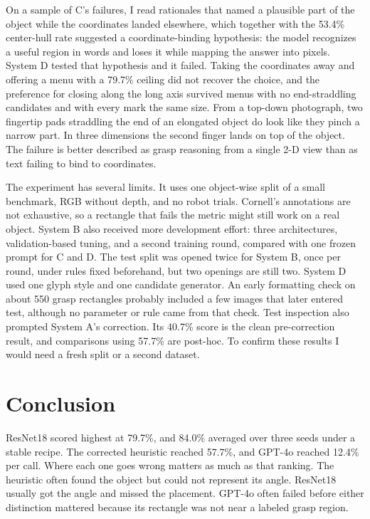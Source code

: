 \documentclass[10pt,conference,compsoc]{IEEEtran}
\begin{document}
On a sample of C's failures, I read rationales that named a plausible part of
the object while the coordinates landed elsewhere, which together with the
53.4\% center-hull rate suggested a coordinate-binding hypothesis: the model
recognizes a useful region in words and loses it while mapping the answer
into pixels. System D tested that hypothesis and it failed. Taking the
coordinates away and offering a menu with a 79.7\% ceiling did not recover
the choice, and the preference for closing along the long axis survived
menus with no end-straddling candidates and with every mark the same size.
From a top-down photograph, two fingertip pads straddling the end of an
elongated object do look like they pinch a narrow part. In three dimensions
the second finger lands on top of the object. The failure is better
described as grasp reasoning from a single 2-D view than as text failing to
bind to coordinates.

The experiment has several limits. It uses one object-wise split of a small
benchmark, RGB without depth, and no robot trials. Cornell's annotations are
not exhaustive, so a rectangle that fails the metric might still work on a
real object. System B also received more development effort: three
architectures, validation-based tuning, and a second training round,
compared with one frozen prompt for C and D. The test split was opened
twice for System B, once per round, under rules fixed beforehand, but two
openings are still two. System D used one glyph style and one candidate
generator. An early formatting check on about 550 grasp rectangles probably
included a few images that later entered test, although no parameter or rule
came from that check. Test inspection also prompted System A's correction.
Its 40.7\% score is the clean pre-correction result, and comparisons
using 57.7\% are post-hoc. To confirm these results I would need a fresh split or a second dataset.

\section{Conclusion}

ResNet18 scored highest at 79.7\%, and 84.0\% averaged over three seeds
under a stable recipe. The corrected heuristic reached 57.7\%, and GPT-4o
reached 12.4\% per call. Where each one goes wrong matters as much as that
ranking. The heuristic often found the object but could not represent
its angle. ResNet18 usually got the angle and missed the placement. GPT-4o
often failed before either distinction mattered because its rectangle was not
near a labeled grasp region.
\end{document}
